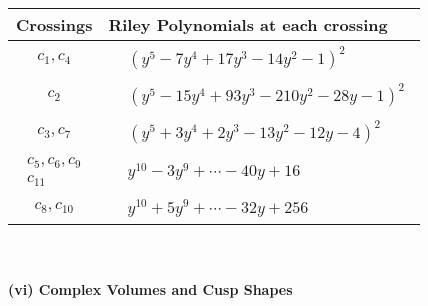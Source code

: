 \documentclass[1p]{elsarticle_modified}
\theoremstyle{definition}
\begin{document}
\begin{tabular}{m{50pt}|m{274pt}}
Crossings & \hspace{64pt}Riley Polynomials at each crossing \\
\hline $$\begin{aligned}c_{1},c_{4}\end{aligned}$$&$\begin{aligned}
&(y^5-7 y^4+17 y^3-14 y^2-1)^2
\end{aligned}$\\
\hline $$\begin{aligned}c_{2}\end{aligned}$$&$\begin{aligned}
&(y^5-15 y^4+93 y^3-210 y^2-28 y-1)^2
\end{aligned}$\\
\hline $$\begin{aligned}c_{3},c_{7}\end{aligned}$$&$\begin{aligned}
&(y^5+3 y^4+2 y^3-13 y^2-12 y-4)^2
\end{aligned}$\\
\hline $$\begin{aligned}c_{5},c_{6},c_{9}\\c_{11}\end{aligned}$$&$\begin{aligned}
&y^{10}-3 y^9+\cdots-40 y+16
\end{aligned}$\\
\hline $$\begin{aligned}c_{8},c_{10}\end{aligned}$$&$\begin{aligned}
&y^{10}+5 y^9+\cdots-32 y+256
\end{aligned}$\\
\hline
\end{tabular}\\~\\
\newpage\flushleft \textbf{(vi) Complex Volumes and Cusp Shapes}
\end{document}
